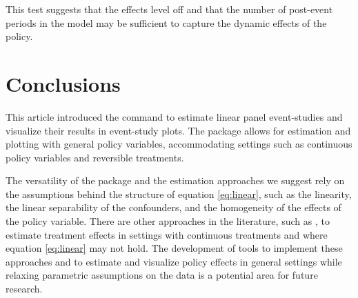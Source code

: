 \documentclass[12pt]{article}
\begin{document}
\begin{stlog}
	\nullskip
\end{stlog}

This test suggests that the effects level off and that the number of post-event periods in the model may be sufficient to capture the dynamic effects of the policy.

\section{Conclusions}

This article introduced the \xtevent command to estimate linear panel event-studies and visualize their results in event-study plots.
The package allows for estimation and plotting with general policy variables, accommodating settings such as continuous policy variables and reversible treatments.

The versatility of the package and the estimation approaches we suggest rely on the assumptions behind the structure of equation \eqref{eq:linear}, such as the linearity, the linear separability of the confounders, and the homogeneity of the effects of the policy variable.
There are other approaches in the literature, such as \cite{Callaway2024}, to estimate treatment effects in settings with continuous treatments and where equation \eqref{eq:linear} may not hold.
The development of tools to implement these approaches and to estimate and visualize policy effects in general settings while relaxing parametric assumptions on the data is a potential area for future research.


%
%







\end{document}
